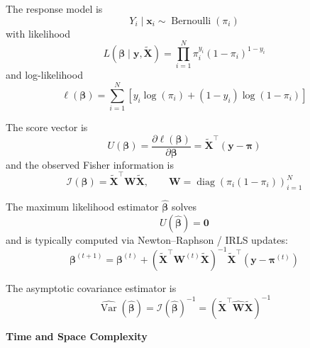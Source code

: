 The response model is
\begin{equation}
    Y_i \mid \mathbf{x}_i \sim \operatorname{Bernoulli}(\pi_i)
\end{equation}
with likelihood
\begin{equation}
    L(\boldsymbol{\beta} \mid \mathbf{y},\tilde{\mathbf{X}})
    =
    \prod_{i=1}^{N} \pi_i^{y_i}(1-\pi_i)^{1-y_i}
\end{equation}
and log-likelihood
\begin{equation}
    \ell(\boldsymbol{\beta})
    =
    \sum_{i=1}^{N}
    \left[
    y_i \log(\pi_i) + (1-y_i)\log(1-\pi_i)
    \right]
\end{equation}

The score vector is
\begin{equation}
    U(\boldsymbol{\beta})
    =
    \frac{\partial \ell(\boldsymbol{\beta})}{\partial \boldsymbol{\beta}}
    =
    \tilde{\mathbf{X}}^\top(\mathbf{y} - \boldsymbol{\pi})
\end{equation}
and the observed Fisher information is
\begin{equation}
    \mathcal{I}(\boldsymbol{\beta})
    =
    \tilde{\mathbf{X}}^\top \mathbf{W} \tilde{\mathbf{X}},
    \qquad
    \mathbf{W} = \operatorname{diag}\!\left(\pi_i(1-\pi_i)\right)_{i=1}^{N}
\end{equation}

The maximum likelihood estimator $\hat{\boldsymbol{\beta}}$ solves
\begin{equation}
    U(\hat{\boldsymbol{\beta}}) = \mathbf{0}
\end{equation}
and is typically computed via Newton--Raphson / IRLS updates:
\begin{equation}
    \boldsymbol{\beta}^{(t+1)}
    =
    \boldsymbol{\beta}^{(t)}
    +
    \left(\tilde{\mathbf{X}}^\top \mathbf{W}^{(t)} \tilde{\mathbf{X}}\right)^{-1}
    \tilde{\mathbf{X}}^\top(\mathbf{y} - \boldsymbol{\pi}^{(t)})
\end{equation}

The asymptotic covariance estimator is
\begin{equation}
    \widehat{\operatorname{Var}}(\hat{\boldsymbol{\beta}})
    =
    \mathcal{I}(\hat{\boldsymbol{\beta}})^{-1}
    =
    \left(\tilde{\mathbf{X}}^\top \hat{\mathbf{W}} \tilde{\mathbf{X}}\right)^{-1}
\end{equation}

\textbf{Time and Space Complexity}

